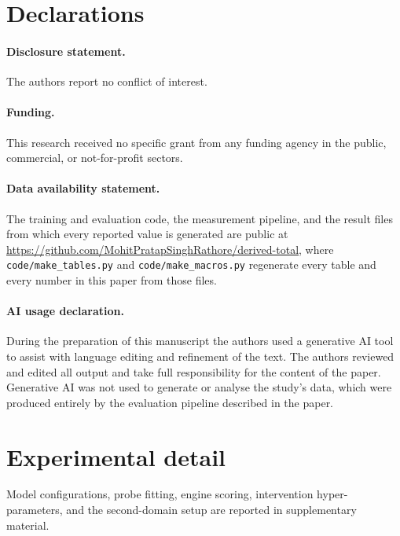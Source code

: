\documentclass[manuscript, screen, review]{jair}
\theoremstyle{remark}
\newif\ifanon
\begin{document}
\section*{Declarations}

\paragraph{Disclosure statement.}
\ifanon
Removed for double-anonymous peer review.
\else
The authors report no conflict of interest.
\fi

\paragraph{Funding.}
\ifanon
Removed for double-anonymous peer review.
\else
This research received no specific grant from any funding agency in the public,
commercial, or not-for-profit sectors.
\fi

\paragraph{Data availability statement.}
\ifanon
The code and evaluation artifacts will be made available upon acceptance.
\else
The training and evaluation code, the measurement pipeline, and the result files
from which every reported value is generated are public at
\url{https://github.com/MohitPratapSinghRathore/derived-total}, where
\texttt{code/make\_tables.py} and \texttt{code/make\_macros.py} regenerate every
table and every number in this paper from those files.
\fi

\paragraph{AI usage declaration.}
During the preparation of this manuscript the authors used a generative AI tool
to assist with language editing and refinement of the text. The authors reviewed
and edited all output and take full responsibility for the content of the paper.
Generative AI was not used to generate or analyse the study's data, which were
produced entirely by the evaluation pipeline described in the paper.


\appendix

\section{Experimental detail}

Model configurations, probe fitting, engine scoring, intervention hyper-parameters, and the second-domain setup are reported in supplementary material.
\end{document}
